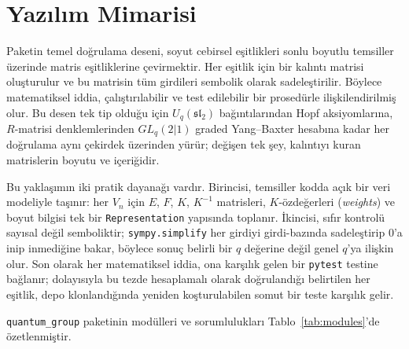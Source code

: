 \documentclass[12pt,a4paper,fleqn]{report}
\newcommand{\normalsemi}{;}
\newcommand{\normalsemi}{\begingroup\semicolonfont;\endgroup}
\numberwithin{equation}{chapter}
\theoremstyle{plain}
\theoremstyle{definition}
\renewcommand{\sl}{\mathfrak{sl}}
\newcommand{\Uq}{U_q(\sl_2)}
\begin{document}
\chapter{Yazılım Mimarisi}

Paketin temel doğrulama deseni, soyut cebirsel eşitlikleri sonlu boyutlu
temsiller üzerinde matris eşitliklerine çevirmektir. Her eşitlik için bir kalıntı
matrisi oluşturulur ve bu matrisin tüm girdileri sembolik olarak sadeleştirilir.
Böylece matematiksel iddia, çalıştırılabilir ve test edilebilir bir prosedürle
ilişkilendirilmiş olur. Bu desen tek tip olduğu için $\Uq$ bağıntılarından Hopf
aksiyomlarına, $R$-matrisi denklemlerinden $GL_q(2|1)$ graded Yang--Baxter
hesabına kadar her doğrulama aynı çekirdek üzerinden yürür\normalsemi{} değişen tek şey,
kalıntıyı kuran matrislerin boyutu ve içeriğidir.

Bu yaklaşımın iki pratik dayanağı vardır. Birincisi, temsiller kodda açık bir
veri modeliyle taşınır: her $V_n$ için $E$, $F$, $K$, $K^{-1}$ matrisleri,
$K$-özdeğerleri (\emph{weights}) ve boyut bilgisi tek bir \texttt{Representation}
yapısında toplanır. İkincisi, sıfır kontrolü sayısal değil semboliktir\normalsemi{}
\texttt{sympy.simplify} her girdiyi girdi-bazında sadeleştirip $0$'a inip
inmediğine bakar, böylece sonuç belirli bir $q$ değerine değil genel $q$'ya
ilişkin olur. Son olarak her matematiksel iddia, ona karşılık gelen bir
\texttt{pytest} testine bağlanır\normalsemi{} dolayısıyla bu tezde hesaplamalı olarak
doğrulandığı belirtilen her eşitlik, depo klonlandığında yeniden koşturulabilen
somut bir teste karşılık gelir.

\texttt{quantum\_group} paketinin modülleri ve sorumlulukları
Tablo~\ref{tab:modules}'de özetlenmiştir.
\end{document}
